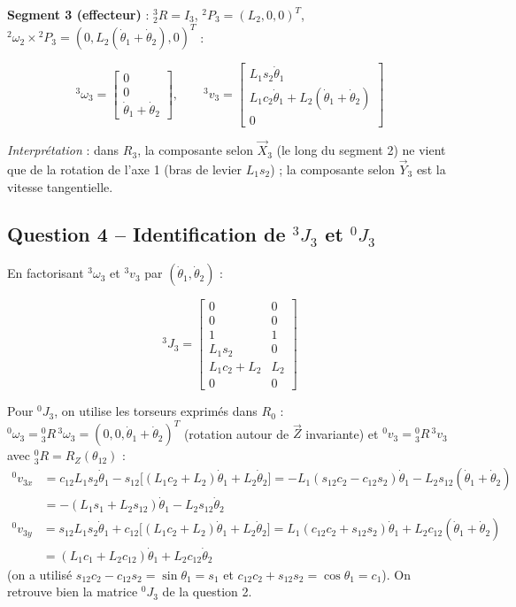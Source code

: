 \documentclass[11pt,a4paper]{article}
\newcommand{\dt}[1]{\dot\theta_{#1}}
\newcommand{\col}[3]{\begin{bmatrix}#1\\#2\\#3\end{bmatrix}}
\begin{document}
\textbf{Segment 3 (effecteur)} : ${}^3_2R=I_3$, ${}^2P_3=(L_2,0,0)^T$, ${}^2\omega_2\times{}^2P_3=(0,L_2(\dt1+\dt2),0)^T$ :
\begin{res}
\[{}^3\omega_3=\col00{\dt1+\dt2},\qquad {}^3v_3=\col{L_1s_2\dt1}{L_1c_2\dt1+L_2(\dt1+\dt2)}{0}\]
\end{res}
\emph{Interprétation} : dans $R_3$, la composante selon $\vec X_3$ (le long du segment 2) ne vient que de la rotation de l'axe 1 (bras de levier $L_1s_2$) ; la composante selon $\vec Y_3$ est la vitesse tangentielle.

\subsection*{Question 4 -- Identification de ${}^3J_3$ et ${}^0J_3$}
En factorisant ${}^3\omega_3$ et ${}^3v_3$ par $(\dt1,\dt2)$ :
\begin{res}
\[{}^3J_3=\begin{bmatrix}0&0\\0&0\\1&1\\L_1s_2&0\\L_1c_2+L_2&L_2\\0&0\end{bmatrix}\]
\end{res}
Pour ${}^0J_3$, on utilise les torseurs exprimés dans $R_0$ : ${}^0\omega_3={}^0_3R\,{}^3\omega_3=(0,0,\dt1+\dt2)^T$ (rotation autour de $\vec Z$ invariante) et ${}^0v_3={}^0_3R\,{}^3v_3$ avec ${}^0_3R=R_Z(\theta_{12})$ :
\begin{align*}{}^0v_{3x}&=c_{12}L_1s_2\dt1-s_{12}\big[(L_1c_2+L_2)\dt1+L_2\dt2\big]=-L_1(s_{12}c_2-c_{12}s_2)\dt1-L_2s_{12}(\dt1+\dt2)\\&=-(L_1s_1+L_2s_{12})\dt1-L_2s_{12}\dt2\end{align*}
\begin{align*}{}^0v_{3y}&=s_{12}L_1s_2\dt1+c_{12}\big[(L_1c_2+L_2)\dt1+L_2\dt2\big]=L_1(c_{12}c_2+s_{12}s_2)\dt1+L_2c_{12}(\dt1+\dt2)\\&=(L_1c_1+L_2c_{12})\dt1+L_2c_{12}\dt2\end{align*}
(on a utilisé $s_{12}c_2-c_{12}s_2=\sin\theta_1=s_1$ et $c_{12}c_2+s_{12}s_2=\cos\theta_1=c_1$). On retrouve bien la matrice ${}^0J_3$ de la question 2.
\end{document}
